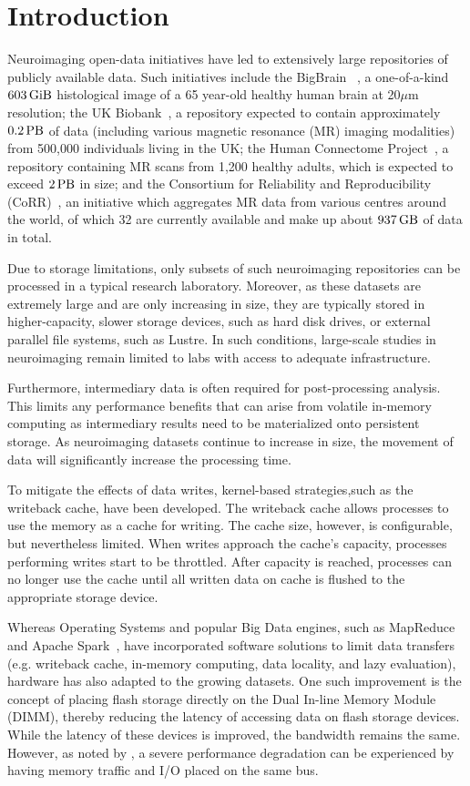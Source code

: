 \documentclass[conference]{IEEEtran}
\newcommand{\bigbrain}{BigBrain }
\begin{document}
\section{Introduction}
Neuroimaging open-data initiatives have led to extensively large repositories of
publicly available data. Such initiatives include the \bigbrain~\cite{BigBrain}, 
a one-of-a-kind $\SI{603}{\gibi\byte}$
histological image of a 65 year-old healthy human brain
at 20$\mu$m resolution; the UK Biobank~\cite{ukbiobank}, a repository expected to
contain approximately $\SI{0.2}{\peta\byte}$ of data (including various magnetic
resonance (MR) imaging modalities) from 500,000 individuals living in the UK;
the Human Connectome Project~\cite{HCP}, a repository containing MR scans from
1,200 healthy adults, which is expected to exceed $\SI{2}{\peta\byte}$ in size; 
and the Consortium for Reliability and Reproducibility (CoRR)~\cite{corr}, an
initiative which aggregates MR data from various centres around the world, 
of which 32 are currently available and make up about $\SI{937}{\giga\byte}$ of
data in total.

Due to storage limitations, only subsets of such neuroimaging repositories 
can be processed in a typical research laboratory. Moreover, as these datasets 
are extremely large and are only increasing in size, they are typically stored 
in higher-capacity, slower storage devices, such as hard disk drives, or external
parallel file systems, such as Lustre. In such conditions, large-scale 
studies in neuroimaging remain limited to labs with access to adequate 
infrastructure.

Furthermore, intermediary data is often required for post-processing analysis. This limits
any performance benefits that can arise from volatile in-memory computing as intermediary
results need to be materialized onto persistent storage. As neuroimaging datasets continue
to increase in size, the movement of data will significantly increase the processing time.

To mitigate the effects of data writes, kernel-based
strategies,such as the writeback cache, have been developed. The writeback cache
allows processes to use the memory as a cache for writing. The cache size,
however,
is configurable, but nevertheless limited. When writes approach the cache's capacity,
processes performing writes start to be throttled. After capacity is reached,
processes can no longer use the cache until all written data on cache is flushed
to the appropriate storage device.

Whereas Operating Systems and popular Big Data engines, such as MapReduce~\cite{mapreduce} and Apache Spark~\cite{spark}, have
incorporated software solutions to limit data transfers (e.g. writeback cache, in-memory computing,
data locality, and lazy evaluation), hardware has also adapted to the growing datasets.
One such improvement is the concept of placing flash storage directly on the Dual
In-line Memory Module (DIMM), thereby reducing the latency of accessing data on 
flash storage devices. While the latency of these devices is improved, the bandwidth
remains the same. However, as noted by \cite{nvdimms}, a severe performance degradation
can be experienced by having memory traffic and I/O placed on the same bus.
\end{document}
